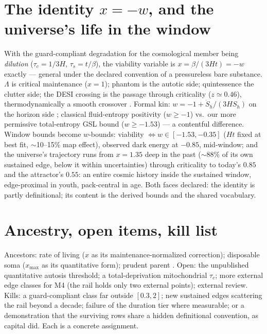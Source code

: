 \documentclass[11pt]{article}
\begin{document}
\section{The identity $x = -w$, and the universe's life in the window}
With the guard-compliant degradation for the cosmological member being \emph{dilution}
($\tau_c = 1/3H$, $\tau_s = t/\beta$), the viability variable is $x = \beta/(3Ht) = -w$ exactly
--- general under the declared convention of a pressureless bare substance. $\Lambda$ is critical
maintenance ($x = 1$); phantom is the autotic side; quintessence the clutter side; the DESI
crossing is the passage through criticality ($z \simeq 0.46$), thermodynamically a smooth
crossover \cite{Crossing}. Formal kin: $w = -1 + \dot S_h/(3HS_h)$ on the horizon side
\cite{Reco2026}; classical fluid-entropy positivity ($w \ge -1$) \cite{Duarte2019} vs.\ our more
permissive total-entropy GSL bound ($w \ge -1.53$) --- a contentful difference. Window bounds
become $w$-bounds: viability $\Leftrightarrow w \in [-1.53, -0.35]$ ($Ht$ fixed at best fit,
$\sim$10--15\% map effect), observed dark energy at $-0.85$, mid-window; and the universe's
trajectory runs from $x = 1.35$ deep in the past ($\sim$88\% of its own sustained edge, below it
within uncertainties) through criticality to today's $0.85$ and the attractor's $0.55$: an
entire cosmic history inside the sustained window, edge-proximal in youth, pack-central in age.
Both faces declared: the identity is partly definitional; its content is the derived bounds and
the shared vocabulary.

\section{Ancestry, open items, kill list}
Ancestors: rate of living \cite{Pearl1928,Speakman2005} ($x$ as its maintenance-normalized
correction); disposable soma \cite{Kirkwood1977} ($x_{\max}$ as its quantitative form); prudent
parent \cite{DrentDaan}. Open: the unpublished quantitative autosis threshold; a total-deprivation
mitochondrial $\tau_c$; more external edge classes for M4 (the rail holds only two external
points); external review. Kills: a guard-compliant class far outside $[0.3, 2]$; new sustained
edges scattering the rail beyond a decade; failure of the duration tier where measurable; or a
demonstration that the surviving rows share a hidden definitional convention, as capital did.
Each is a concrete assignment.
\end{document}
